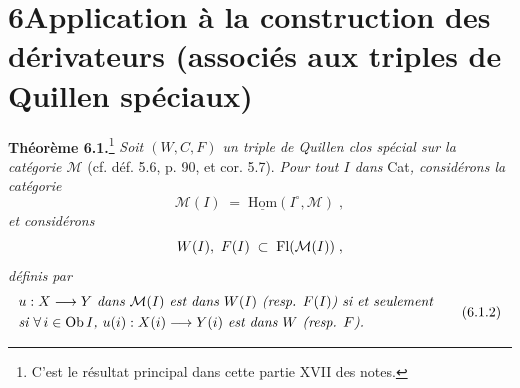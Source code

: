 

\section*{6\quad Application à la construction des dérivateurs (associés aux triples de Quillen spéciaux)}

\textbf{Théorème 6.1.}\footnote[29]{C'est le résultat principal dans cette partie XVII des notes.} \textit{Soit $(W,C,F)$ un triple de Quillen clos spécial sur la catégorie $\mathcal{M}$} (cf. déf. 5.6, p. 90, et cor. 5.7). \textit{Pour tout $I$ dans} Cat\textit{, considérons la catégorie}
\[
\mathcal{M}(I) \;=\; \underline{\mathrm{Hom}}(I^{\circ},\mathcal{M}) \;, \tag*{(6.1.1)}
\]
\textit{et considérons}
\[
W(I),\ F(I) \;\subset\; \operatorname{Fl}(\mathcal{M}(I)) \;,
\]
\textit{définis par}
\[
\begin{aligned}
&\text{\textit{$u : X \longrightarrow Y$ dans $\mathcal{M}(I)$ est dans $W(I)$ (resp. $F(I)$) si et seulement}}\\
&\text{\textit{si $\forall\, i \in \operatorname{Ob} I$, $u(i) : X(i) \longrightarrow Y(i)$ est dans $W$ (resp. $F$).}}
\end{aligned}
\tag*{(6.1.2)}
\]

